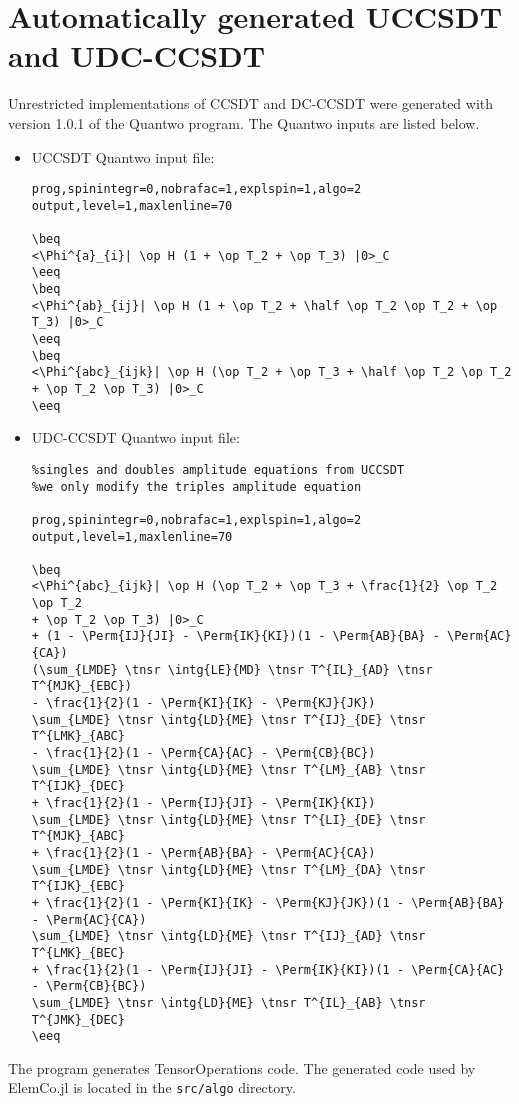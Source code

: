 \documentclass[a4paper,12pt,oneside]{book}
\newcommand{\veryshortarrow}[1][3pt]{\mathrel{%
   \hbox{\rule[\dimexpr\fontdimen22\textfont2-.2pt\relax]{#1}{.4pt}}%
   \mkern-4mu\hbox{\usefont{U}{lasy}{m}{n}\symbol{41}}}}
\newcommand{\beq}{\begin{equation}\begin{aligned}}
\newcommand{\eeq}{\end{aligned}\end{equation}}
\newcommand{\half}{\frac{1}{2}}
\newcommand{\op}{\hat}
\newcommand{\tnsr}{}
\newcommand{\Perm}[2]{{\cal P}\left({#1}\veryshortarrow {#2}\right)}
\newcommand{\ElemCojl}{\textsf{ElemCo.jl} }
\newcommand{\quantwo}{\textsf{Quantwo} }
\begin{document}
\chapter{Automatically generated UCCSDT and UDC-CCSDT}
Unrestricted implementations of CCSDT and DC-CCSDT\cite{kats19_dc,rishi19,schraivogel21_dc} were generated with version 1.0.1 of the \quantwo program\cite{quantwo}.
The \quantwo inputs are listed below.
\begin{itemize}
  \item UCCSDT \quantwo input file:
\begin{lstlisting}
prog,spinintegr=0,nobrafac=1,explspin=1,algo=2
output,level=1,maxlenline=70

\beq
<\Phi^{a}_{i}| \op H (1 + \op T_2 + \op T_3) |0>_C
\eeq
\beq
<\Phi^{ab}_{ij}| \op H (1 + \op T_2 + \half \op T_2 \op T_2 + \op T_3) |0>_C
\eeq
\beq
<\Phi^{abc}_{ijk}| \op H (\op T_2 + \op T_3 + \half \op T_2 \op T_2 + \op T_2 \op T_3) |0>_C
\eeq
\end{lstlisting}
\item UDC-CCSDT \quantwo input file:
\begin{lstlisting}
%singles and doubles amplitude equations from UCCSDT
%we only modify the triples amplitude equation

prog,spinintegr=0,nobrafac=1,explspin=1,algo=2
output,level=1,maxlenline=70

\beq
<\Phi^{abc}_{ijk}| \op H (\op T_2 + \op T_3 + \frac{1}{2} \op T_2 \op T_2 
+ \op T_2 \op T_3) |0>_C 
+ (1 - \Perm{IJ}{JI} - \Perm{IK}{KI})(1 - \Perm{AB}{BA} - \Perm{AC}{CA})
(\sum_{LMDE} \tnsr \intg{LE}{MD} \tnsr T^{IL}_{AD} \tnsr T^{MJK}_{EBC}) 
- \frac{1}{2}(1 - \Perm{KI}{IK} - \Perm{KJ}{JK}) 
\sum_{LMDE} \tnsr \intg{LD}{ME} \tnsr T^{IJ}_{DE} \tnsr T^{LMK}_{ABC} 
- \frac{1}{2}(1 - \Perm{CA}{AC} - \Perm{CB}{BC}) 
\sum_{LMDE} \tnsr \intg{LD}{ME} \tnsr T^{LM}_{AB} \tnsr T^{IJK}_{DEC} 
+ \frac{1}{2}(1 - \Perm{IJ}{JI} - \Perm{IK}{KI}) 
\sum_{LMDE} \tnsr \intg{LD}{ME} \tnsr T^{LI}_{DE} \tnsr T^{MJK}_{ABC} 
+ \frac{1}{2}(1 - \Perm{AB}{BA} - \Perm{AC}{CA}) 
\sum_{LMDE} \tnsr \intg{LD}{ME} \tnsr T^{LM}_{DA} \tnsr T^{IJK}_{EBC} 
+ \frac{1}{2}(1 - \Perm{KI}{IK} - \Perm{KJ}{JK})(1 - \Perm{AB}{BA} - \Perm{AC}{CA}) 
\sum_{LMDE} \tnsr \intg{LD}{ME} \tnsr T^{IJ}_{AD} \tnsr T^{LMK}_{BEC} 
+ \frac{1}{2}(1 - \Perm{IJ}{JI} - \Perm{IK}{KI})(1 - \Perm{CA}{AC} - \Perm{CB}{BC}) 
\sum_{LMDE} \tnsr \intg{LD}{ME} \tnsr T^{IL}_{AB} \tnsr T^{JMK}_{DEC}
\eeq
\end{lstlisting}
\end{itemize}
\noindent The program generates \textsf{TensorOperations} code.
The generated code  used by \ElemCojl is located in the \texttt{src/algo} directory. 


\end{document}
